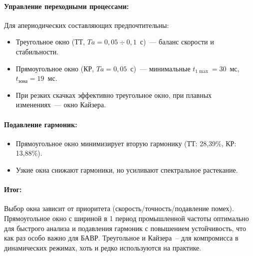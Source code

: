 \paragraph{Управление переходными процессами:}
Для апериодических составляющих предпочтительны:
\begin{itemize}[noitemsep,topsep=2pt]
\item Треугольное окно (ТТ, $Ta=0{,}05 \div 0{,}1$~с)~--- баланс скорости и стабильности.
\item Прямоугольное окно (КР, $Ta=0{,}05$~с)~--- минимальные $t_{1\max}=30$~мс, $t_{\text{зона}}=19$~мс.
\item При резких скачках эффективно треугольное окно, при плавных изменениях~--- окно Кайзера.
\end{itemize}

\paragraph{Подавление гармоник:}
\begin{itemize}[noitemsep,topsep=2pt]
\item Прямоугольное окно минимизирует вторую гармонику (ТТ: 28,39\%, КР: 13,88\%).
\item Узкие окна снижают гармоники, но усиливают спектральное растекание.
\end{itemize}

\paragraph{Итог:} Выбор окна зависит от приоритета (скорость/точность/подавление помех). Прямоугольное окно с шириной в 1 период промышленной частоты оптимально для быстрого анализа и подавления гармоник с повышением устойчивость, что как раз особо важно для БАВР. Треугольное и Кайзера~-- для компромисса в динамических режимах, хоть и редко используются на практике.



